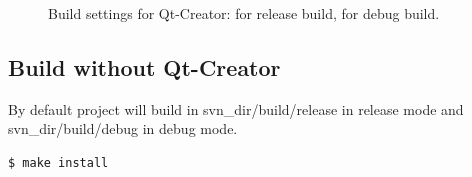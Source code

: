 \documentclass[11pt, oneside, a4paper]{scrartcl}
\begin{document}
\begin{figure}[ht]
  \centering
  \caption{Build settings for Qt-Creator:  for release build,  for debug build.}
\end{figure}

\subsection{Build without Qt-Creator}

By default project will build in svn\_dir/build/release in release mode and svn\_dir/build/debug in debug mode.

\begin{lstlisting}
$ make install
\end{lstlisting}
\end{document}
